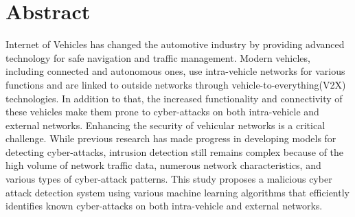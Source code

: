 \chapter{Abstract}
\Large
    Internet of Vehicles has changed the automotive industry by providing advanced technology for safe navigation and traffic management. Modern vehicles, including connected and autonomous ones, use intra-vehicle networks for various functions and are linked to outside networks through vehicle-to-everything(V2X) technologies. In addition to that, the increased functionality and connectivity of these vehicles make them prone to cyber-attacks on both intra-vehicle and external networks. Enhancing the security of vehicular networks is a critical challenge. While previous research has made progress in developing models for detecting cyber-attacks, intrusion detection still remains complex because of the high volume of network traffic data, numerous network characteristics, and various types of cyber-attack patterns. This study proposes a malicious cyber attack detection system using various machine learning algorithms that efficiently identifies known cyber-attacks on both intra-vehicle and external networks. 


